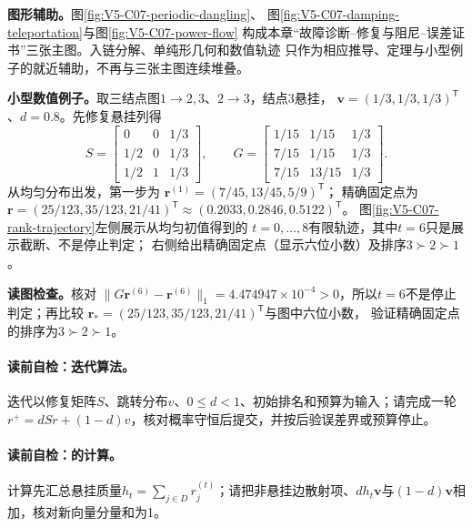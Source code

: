 \label{struct:V5-C07-CH17}
\textbf{图形辅助。}图\ref{fig:V5-C07-periodic-dangling}、
图\ref{fig:V5-C07-damping-teleportation}与图\ref{fig:V5-C07-power-flow}
构成本章“故障诊断--修复与阻尼--误差证书”三张主图。入链分解、单纯形几何和数值轨迹
只作为相应推导、定理与小型例子的就近辅助，不再与三张主图连续堆叠。

\label{struct:V5-C07-CH18}
\textbf{小型数值例子。}取三结点图$1\to2,3$、$2\to3$，结点$3$悬挂，
$\boldsymbol v=(1/3,1/3,1/3)^{\mathsf T}$、$d=0.8$。先修复悬挂列得
\[
S=\begin{bmatrix}0&0&1/3\\1/2&0&1/3\\1/2&1&1/3\end{bmatrix},
\qquad
G=\begin{bmatrix}1/15&1/15&1/3\\7/15&1/15&1/3\\7/15&13/15&1/3\end{bmatrix}.
\]
从均匀分布出发，第一步为
$\boldsymbol r^{(1)}=(7/45,13/45,5/9)^{\mathsf T}$；
精确固定点为
$\boldsymbol r=(25/123,35/123,21/41)^{\mathsf T}\approx(0.2033,0.2846,0.5122)^{\mathsf T}$。
图\ref{fig:V5-C07-rank-trajectory}左侧展示从均匀初值得到的
$t=0,\ldots,8$有限轨迹，其中$t=6$只是展示截断、不是停止判定；
右侧给出精确固定点（显示六位小数）及排序$3\succ2\succ1$。

\FloatBarrier
\noindent\textbf{读图检查。}核对
$\lVert G\boldsymbol r^{(6)}-\boldsymbol r^{(6)}\rVert_1
=4.474947\times10^{-4}>0$，所以$t=6$不是停止判定；再比较
$\boldsymbol r_*=(25/123,35/123,21/41)^{\mathsf T}$与图中六位小数，
验证精确固定点的排序为$3\succ2\succ1$。

\paragraph{读前自检：\PageRank{}迭代算法。}\PageRank{}迭代以修复矩阵$S$、跳转分布$v$、$0\le d<1$、初始排名和预算为输入；请完成一轮$r^+=dSr+(1-d)v$，核对概率守恒后提交，并按后验误差界或预算停止。\par
\paragraph{读前自检：\PageRank{}的计算。}\PageRank{}计算先汇总悬挂质量$h_t=\sum_{j\in D}r_j^{(t)}$；请把非悬挂边散射项、$dh_t\boldsymbol v$与$(1-d)\boldsymbol v$相加，核对新向量分量和为1。\par
